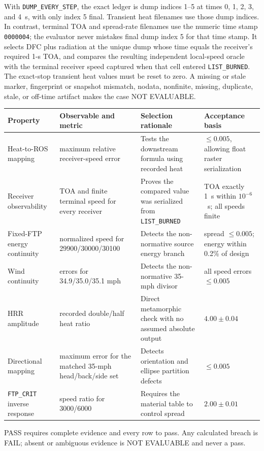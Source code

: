 With \texttt{DUMP\_EVERY\_STEP}, the exact ledger is dump indices 1--5 at
times 0, 1, 2, 3, and 4~s, with only index 5 final.  Transient heat filenames
use those dump indices.  In contrast, terminal TOA and spread-rate filenames
use the numeric time stamp \texttt{0000004}; the evaluator never mistakes final
dump index 5 for that time stamp.  It selects DFC plus radiation at the unique
dump whose time equals the receiver's required 1-s TOA, and compares the
resulting independent local-speed oracle with the terminal receiver speed
captured when that cell entered \texttt{LIST\_BURNED}.  The exact-stop transient
heat values must be reset to zero.  A missing or stale marker, fingerprint or
snapshot mismatch, nodata, nonfinite, missing, duplicate, stale, or off-time
artifact makes the case NOT EVALUABLE.

\begin{center}

\begin{longtable}{@{}P{0.19\textwidth}P{0.21\textwidth}P{0.25\textwidth}P{0.24\textwidth}@{}}\toprule
Property & Observable and metric & Selection rationale & Acceptance basis\\\midrule
Heat-to-ROS mapping & maximum relative receiver-speed error & Tests the downstream formula using recorded heat & \(\leq0.005\), allowing float raster serialization\\
Receiver observability & TOA and finite terminal speed for every receiver & Proves the compared value was serialized from \texttt{LIST\_BURNED} & TOA exactly 1~s within \(10^{-6}\)~s; all speeds finite\\
Fixed-FTP energy continuity & normalized speed for 29900/30000/30100 & Detects the non-normative source energy branch & spread \(\leq0.005\); energy within 0.2\% of design\\
Wind continuity & errors for 34.9/35.0/35.1 mph & Detects the non-normative 35-mph divisor & all speed errors \(\leq0.005\)\\
HRR amplitude & recorded double/half heat ratio & Direct metamorphic check with no assumed absolute output & \(4.00\pm0.04\)\\
Directional mapping & maximum error for the matched 35-mph head/back/side set & Detects orientation and ellipse partition defects & \(\leq0.005\)\\
\texttt{FTP\_CRIT} inverse response & speed ratio for 3000/6000 & Requires the material table to control spread & \(2.00\pm0.01\)\\
\bottomrule\end{longtable}
\end{center}
PASS requires complete evidence and every row to pass.  Any calculated breach is
FAIL; absent or ambiguous evidence is NOT EVALUABLE and never a pass.

